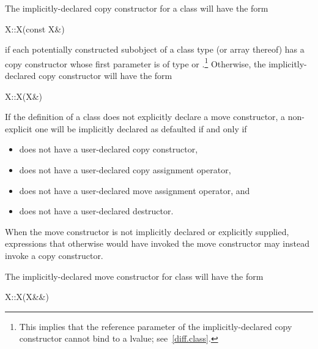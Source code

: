 \pnum
The implicitly-declared copy constructor for a class
will have the form

\begin{codeblock}
X::X(const X&)
\end{codeblock}

if each potentially constructed subobject of a class type
(or array thereof)
has a copy constructor whose first parameter is of type
or
.\footnote{This implies that the reference parameter of the
implicitly-declared copy constructor
cannot bind to a
lvalue; see~\ref{diff.class}.}
Otherwise, the implicitly-declared copy constructor will have the form

\begin{codeblock}
X::X(X&)
\end{codeblock}

\pnum
{}%
If the definition of a class  does not explicitly declare
a move constructor, a non-explicit one will be
implicitly declared as defaulted if and only if

\begin{itemize}
\item
{} does not have a user-declared copy constructor,

\item
{} does not have a user-declared copy assignment operator,

\item
{} does not have a user-declared move assignment operator, and

\item
{} does not have a user-declared destructor.
\end{itemize}

\begin{note} When the move constructor is not implicitly declared or explicitly supplied,
expressions that otherwise would have invoked the move constructor may instead invoke
a copy constructor. \end{note}

\pnum
The implicitly-declared move constructor for class  will have the form
\begin{codeblock}
X::X(X&&)
\end{codeblock}

